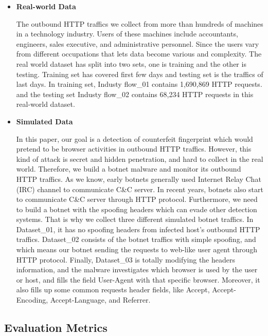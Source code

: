 \begin{itemize}

\item {\bf Real-world Data}

The outbound HTTP traffics we collect from more than hundreds of machines in a technology industry. Users of these machines include accountants, engineers, sales executive, and administrative personnel. Since the users vary from different occupations that lets data become various and complexity. The real world dataset has split into two sets, one is training and the other is testing. Training set has covered first few days and testing set is the traffics of last days. In training set, Industy flow\_01 contains 1,690,869 HTTP requests. and the testing set Industy flow\_02 contains 68,234 HTTP requests in this real-world dataset.

\item {\bf Simulated Data}

In this paper, our goal is a detection of counterfeit fingerprint which would pretend to be browser activities in outbound HTTP traffics. However, this kind of attack is secret and hidden penetration, and hard to collect in the real world. Therefore, we build a botnet malware and monitor its outbound HTTP traffics. As we know, early botnets generally used Internet Relay Chat (IRC) channel to communicate C\&C server. In recent years, botnets also start to communicate C\&C server through HTTP protocol. Furthermore, we need to build a botnet with the spoofing headers which can evade other detection systems. That is why we collect three different simulated botnet traffics. In Dataset\_01, it has no spoofing headers from infected host's outbound HTTP traffics. Dataset\_02 consists of the botnet traffics with simple spoofing, and which means our botnet sending the requests to web-like user agent through HTTP protocol. Finally, Dataset\_03 is totally modifying the headers information, and the malware investigates which browser is used by the user or host, and fills the field User-Agent with that specific browser. Moreover, it also fills up some common requests header fields, like Accept, Accept-Encoding, Accept-Language, and Referrer.

\end{itemize}

\subsection{Evaluation Metrics}

